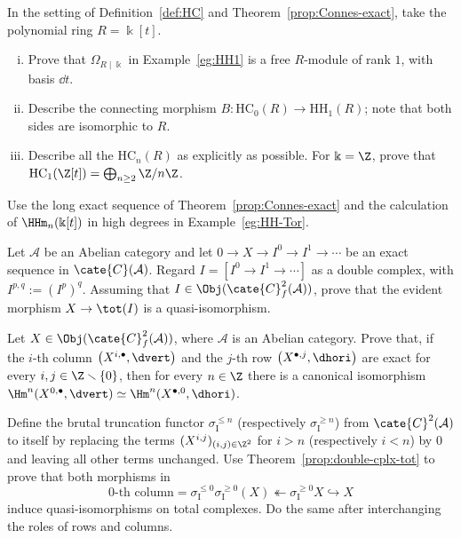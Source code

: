 \begin{Exercises}
	\item In the setting of Definition~\ref{def:HC} and
	Theorem~\ref{prop:Connes-exact}, take the polynomial ring $R=\Bbbk[t]$.
	\begin{enumerate}[(i)]
		\item Prove that $\Omega_{R\mid\Bbbk}$ in Example~\ref{eg:HH1} is a
		free $R$-module of rank $1$, with basis $\dd t$.
		\item Describe the connecting morphism
		$B:\mathrm{HC}_0(R)\to\mathrm{HH}_1(R)$; note that both sides are
		isomorphic to $R$.
		\item Describe all the $\mathrm{HC}_n(R)$ as explicitly as possible.
		For $\Bbbk=\Z$, prove that
		$\mathrm{HC}_1(\Z[t])=\bigoplus_{n\geq2}\Z/n\Z$.
	\end{enumerate}
	\begin{hint}
		Use the long exact sequence of Theorem~\ref{prop:Connes-exact} and the
		calculation of $\HHm_n(\Bbbk[t])$ in high degrees in
		Example~\ref{eg:HH-Tor}.
	\end{hint}

	\item Let $\mathcal{A}$ be an Abelian category and let
	$0\to X\to I^0\to I^1\to\cdots$ be an exact sequence in
	$\cate{C}(\mathcal{A})$. Regard $I=[I^0\to I^1\to\cdots]$ as a
	double complex, with $I^{p,q}:=(I^p)^q$. Assuming that
	$I\in\Obj(\cate{C}^2_f(\mathcal{A}))$, prove that the evident morphism
	$X\to\tot(I)$ is a quasi-isomorphism.

	\item Let $X\in\Obj(\cate{C}^2_f(\mathcal{A}))$, where
	$\mathcal{A}$ is an Abelian category. Prove that, if the $i$-th column
	$\left(X^{i,\bullet},\dvert\right)$ and the $j$-th row
	$\left(X^{\bullet,j},\dhori\right)$ are exact for every
	$i,j\in\Z\smallsetminus\{0\}$, then for every $n\in\Z$ there is a
	canonical isomorphism
	$\Hm^n(X^{0,\bullet},\dvert)\simeq
	\Hm^n(X^{\bullet,0},\dhori)$.

	\begin{hint}
		Define the brutal truncation functor
		$\sigma_{\mathrm{I}}^{\leq n}$ (respectively
		$\sigma_{\mathrm{I}}^{\geq n}$) from
		$\cate{C}^2(\mathcal{A})$ to itself by replacing the terms
		$(X^{i,j})_{(i,j)\in\Z^2}$ for $i>n$ (respectively $i<n$) by $0$ and
		leaving all other terms unchanged. Use
		Theorem~\ref{prop:double-cplx-tot} to prove that both morphisms in
		\[
			\text{$0$-th column}
			=\sigma_{\mathrm{I}}^{\leq0}\sigma_{\mathrm{I}}^{\geq0}(X)
			\twoheadleftarrow
			\sigma_{\mathrm{I}}^{\geq0}X
			\hookrightarrow X
		\]
		induce quasi-isomorphisms on total complexes. Do the same after
		interchanging the roles of rows and columns.
	\end{hint}


\end{Exercises}
